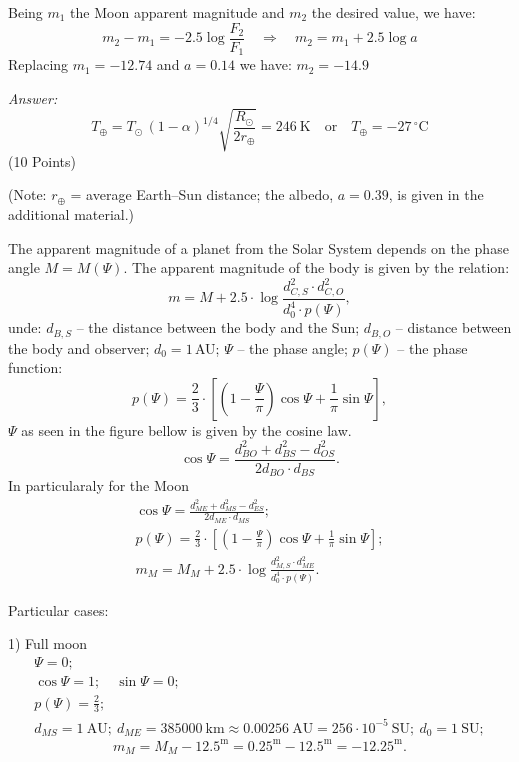 Being $m_1$ the Moon apparent magnitude and $m_2$ the desired value, we have:
\begin{equation*}
m_2 - m_1 = -2.5\log\frac{F_2}{F_1}
\quad\Rightarrow\quad
m_2 = m_1 + 2.5\log a \tag*{(5 pt)}
\end{equation*}
Replacing $m_1 = -12.74$ and $a = 0.14$ we have: $m_2 = \mathbf{-14.9}$

\textit{Answer:}
\[
T_\oplus = T_\odot\,(1-\alpha)^{1/4}\sqrt{\frac{R_\odot}{2r_\oplus}}
         = 246~\mathrm{K}
\quad\text{or}\quad
T_\oplus = -27\,^\circ\mathrm{C}
\]
\hfill(10 Points)

(Note: $r_\oplus$ = average Earth--Sun distance; the albedo, $a = 0.39$, is
given in the additional material.)

The apparent magnitude of a planet from the Solar System depends on the phase
angle $M = M(\Psi)$. The apparent magnitude of the body is given by the
relation:
\[
m = M + 2.5\cdot\log\frac{d_{C,S}^{2}\cdot d_{C,O}^{2}}{d_{0}^{4}\cdot p(\Psi)},
\]
unde: $d_{B,S}$ -- the distance between the body and the Sun; $d_{B,O}$ --
distance between the body and observer; $d_{0} = 1$\,AU; $\Psi$ -- the phase
angle; $p(\Psi)$ -- the phase function:
\[
p(\Psi) = \frac{2}{3}\cdot\left[\left(1 - \frac{\Psi}{\pi}\right)\cos\Psi
  + \frac{1}{\pi}\sin\Psi\right],
\]
$\Psi$ as seen in the figure bellow is given by the cosine law.
\[
\cos\Psi = \frac{d_{BO}^{2} + d_{BS}^{2} - d_{OS}^{2}}{2 d_{BO}\cdot d_{BS}}.
\]
In particularaly for the Moon
\begin{gather*}
\cos\Psi = \frac{d_{ME}^{2} + d_{MS}^{2} - d_{ES}^{2}}{2 d_{ME}\cdot d_{MS}};\\
p(\Psi) = \frac{2}{3}\cdot\left[\left(1 - \frac{\Psi}{\pi}\right)\cos\Psi
  + \frac{1}{\pi}\sin\Psi\right];\\
m_{M} = M_{M} + 2.5\cdot\log\frac{d_{M,S}^{2}\cdot d_{ME}^{2}}
  {d_{0}^{4}\cdot p(\Psi)}.
\end{gather*}

Particular cases:

1) Full moon
\begin{gather*}
\Psi = 0;\\
\cos\Psi = 1;\quad \sin\Psi = 0;\\
p(\Psi) = \frac{2}{3};\\
d_{MS} = 1~\mathrm{AU};\ d_{ME} = 385000~\mathrm{km} \approx 0.00256~\mathrm{AU}
  = 256\cdot10^{-5}~\mathrm{SU};\ d_{0} = 1~\mathrm{SU};
\end{gather*}
\[
m_{M} = M_{M} - 12.5^{\mathrm{m}} = 0.25^{\mathrm{m}} - 12.5^{\mathrm{m}}
      = -12.25^{\mathrm{m}}.
\]

